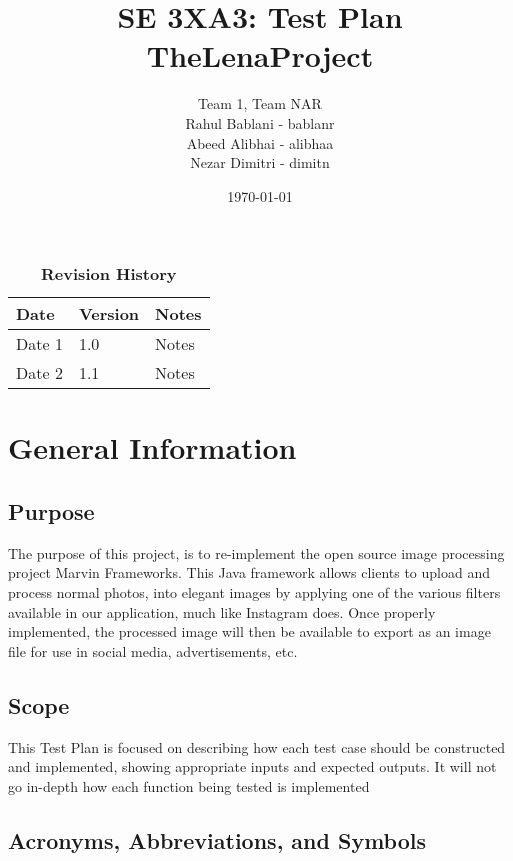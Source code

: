 \documentclass[12pt, titlepage]{article}
\title{SE 3XA3: Test Plan\\TheLenaProject}
\author{Team 1, Team NAR
		\\ Rahul Bablani - bablanr
		\\ Abeed Alibhai - alibhaa
		\\ Nezar Dimitri - dimitn
}
\date{\today}
\begin{document}
\maketitle

\tableofcontents
\listoftables
\listoffigures

\begin{table}[bp]
\caption{\bf Revision History}
\begin{tabularx}{\textwidth}{p{3cm}p{2cm}X}
\toprule {\bf Date} & {\bf Version} & {\bf Notes}\\
\midrule
Date 1 & 1.0 & Notes\\
Date 2 & 1.1 & Notes\\
\bottomrule
\end{tabularx}
\end{table}

\newpage


\section{General Information}

\subsection{Purpose}

The purpose of this project, is to re-implement the open source image processing project Marvin Frameworks. This Java framework allows clients to upload and process normal photos, into elegant images by applying one of the various filters available in our application, much like Instagram does. Once properly implemented, the processed image will then be available to export as an image file for use in social media, advertisements, etc.

\subsection{Scope}

This Test Plan is focused on describing how each test case should be constructed and implemented, showing appropriate inputs and expected outputs. It will not go in-depth how each function being tested is implemented

\subsection{Acronyms, Abbreviations, and Symbols}
	
\end{document}
